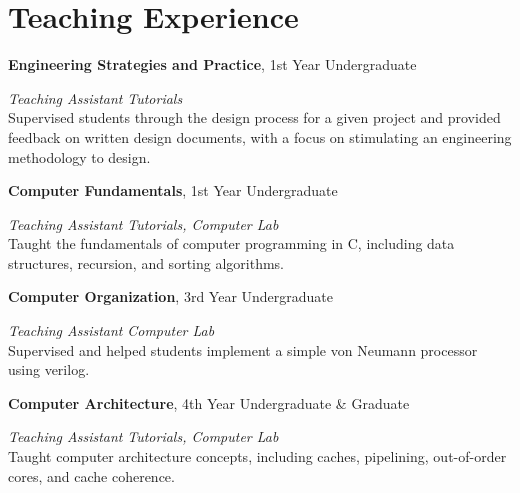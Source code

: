\section{\sc Teaching Experience}

{\bf Engineering Strategies and Practice}, 1st Year Undergraduate
\vspace{-.3cm}

{\em Teaching Assistant} \hfill {\em Tutorials}\\
Supervised students through the design process for a given project and provided feedback on written design documents, 
with a focus on stimulating an engineering methodology to design.

{\bf Computer Fundamentals}, 1st Year Undergraduate
\vspace{-.3cm}

{\em Teaching Assistant} \hfill {\em Tutorials, Computer Lab}\\
Taught the fundamentals of computer programming in C, including data structures, recursion, and sorting algorithms.

{\bf Computer Organization}, 3rd Year Undergraduate
\vspace{-.3cm}

{\em Teaching Assistant} \hfill {\em Computer Lab}\\
Supervised and helped students implement a simple von Neumann processor using verilog.

{\bf Computer Architecture}, 4th Year Undergraduate \& Graduate
\vspace{-.3cm}

{\em Teaching Assistant} \hfill {\em Tutorials, Computer Lab}\\
Taught computer architecture concepts, including caches, pipelining, out-of-order cores, and cache coherence.
